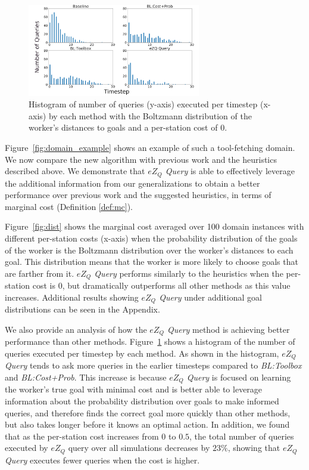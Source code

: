 \documentclass[letterpaper]{article}
\begin{document}
\begin{figure}[t]
\centering
\includegraphics[width=0.9\linewidth,height=1.59in ]{Figures/Boltzmann_Positive_hist_c0_subfigures.png}
\caption{Histogram of number of queries (y-axis) executed per timestep (x-axis) by each method with the Boltzmann distribution of the worker's distances to goals and a per-station cost of 0.}
\label{fig:hist}
\end{figure}

Figure~\ref{fig:domain_example} shows an example of such a tool-fetching domain. We now compare the new algorithm with previous work and the heuristics described above. We demonstrate that \emph{$eZ_Q$ Query} is able to effectively leverage the additional information from our generalizations to obtain a better performance over previous work and the suggested heuristics, in terms of marginal cost (Definition \ref{def:mc}).

Figure~\ref{fig:dist} shows the marginal cost averaged over 100 domain instances with different per-station costs (x-axis) when the probability distribution of the goals of the worker is the Boltzmann distribution over the worker's distances to each goal. This distribution means that the worker is more likely to choose goals that are farther from it. \emph{$eZ_Q$ Query} performs similarly to the heuristics when the per-station cost is 0, but dramatically outperforms all other methods as this value increases.
Additional results showing \emph{$eZ_Q$ Query} under additional goal distributions can be seen in the Appendix.

We also provide an analysis of how the \emph{$eZ_Q$ Query} method is achieving better performance than other methods. Figure~\ref{fig:hist} shows a histogram of the number of queries executed per timestep by each method. As shown in the histogram, \emph{$eZ_Q$ Query} tends to ask more queries in the earlier timesteps compared to \emph{BL:Toolbox} and \emph{BL:Cost+Prob}. This increase is because \emph{$eZ_Q$ Query} is focused on learning the worker's true goal with minimal cost and is better able to leverage information about the probability distribution over goals to make informed queries, and therefore finds the correct goal more quickly than other methods, but also takes longer before it knows an optimal action.
In addition, we found that as the per-station cost increases from $0$ to $0.5$, the total number of queries executed by $eZ_Q$ query over all simulations decreases by $23\%$, showing that \emph{$eZ_Q$ Query} executes fewer queries when the cost is higher.
\end{document}
